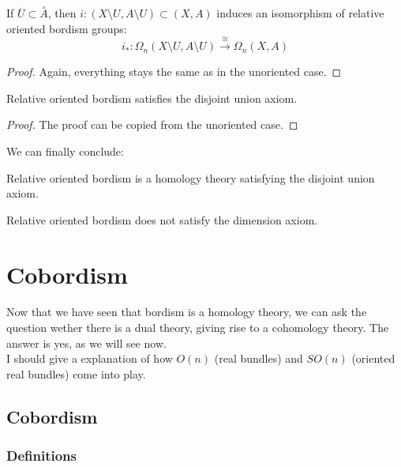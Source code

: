 \documentclass[a4paper,11pt]{article}
\begin{document}
\begin{lemma}
    If \(\overline{U}\subset\overset{\circ}{A}\), then \(i:(X\setminus U, A\setminus U)\subset (X,A)\) induces an isomorphism of relative oriented bordism groups:
    \[i_\ast:\Omega_n(X\setminus U,A\setminus U)\xrightarrow{\cong}\Omega_n(X,A)\]
\end{lemma}

\begin{proof}\cite{conner}
    Again, everything stays the same as in the unoriented case.
\end{proof}

\begin{lemma}
    Relative oriented bordism satisfies the disjoint union axiom.
\end{lemma}

\begin{proof}
    The proof can be copied from the unoriented case.
\end{proof}

We can finally conclude:
\begin{theorem}
    Relative oriented bordism is a homology theory satisfying the disjoint union axiom.
\end{theorem}

\begin{observation}
    Relative oriented bordism does not satisfy the dimension axiom.
\end{observation}


\section{Cobordism}
Now that we have seen that bordism is a homology theory, we can ask the question wether there is a dual theory, giving rise to a cohomology theory. The answer is yes, as we will see now.\\
I should give a explanation of how \(O(n)\) (real bundles) and \(SO(n)\) (oriented real bundles) come into play.

\subsection{Cobordism}

\subsubsection{Definitions}
\end{document}
